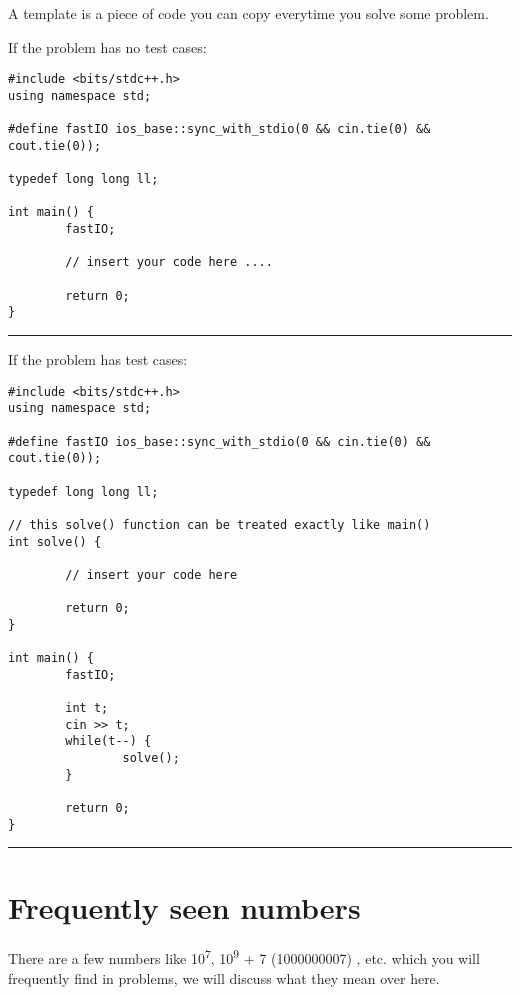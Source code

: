 \documentclass[13pt,oneside,a4paper]{book}
\begin{document}
A template is a piece of code you can copy everytime you solve some problem.
\smallskip

If the  problem has no test cases:
\begin{verbatim}
#include <bits/stdc++.h>
using namespace std;

#define fastIO ios_base::sync_with_stdio(0 && cin.tie(0) && cout.tie(0));

typedef long long ll;

int main() {
        fastIO;

        // insert your code here ....
        
        return 0;
}
\end{verbatim}

\hrule
\bigskip

If the problem has test cases:

\begin{verbatim}
#include <bits/stdc++.h>
using namespace std;

#define fastIO ios_base::sync_with_stdio(0 && cin.tie(0) && cout.tie(0));

typedef long long ll;

// this solve() function can be treated exactly like main()
int solve() {
        
        // insert your code here
        
        return 0;
}

int main() {
        fastIO;

        int t;
        cin >> t;
        while(t--) {
                solve();
        }
        
        return 0;
}
\end{verbatim}

\hrule\bigskip

\section{Frequently seen numbers}

There are a few numbers like 10\textsuperscript{7}, 10\textsuperscript{9} + 7 (1000000007) , etc. which you
will frequently find in problems, we will discuss what they mean over here.
\end{document}
